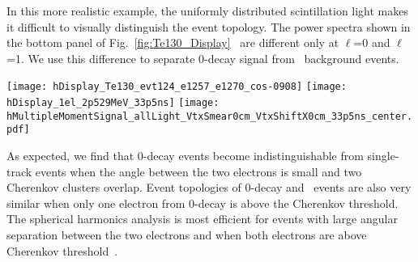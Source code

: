 In this more realistic example, the uniformly distributed
scintillation light makes it difficult to visually distinguish
the event topology. The power spectra shown in the bottom panel of
Fig.~\ref{fig:Te130_Display}~ are different only at $\ell$=0 and
$\ell$=1. We use this difference to separate 0\nbb-decay
signal from \B~background events.

\begin{figure*}[hb]
  \centering
  \texttt{[image: hDisplay\_Te130\_evt124\_e1257\_e1270\_cos-0908]}
  \texttt{[image: hDisplay\_1el\_2p529MeV\_33p5ns]}
  \texttt{[image: hMultipleMomentSignal\_allLight\_VtxSmear0cm\_VtxShiftX0cm\_33p5ns\_center.pdf]} 
  \caption{\emph{Top panels:} Event displays with multiple scattering
and at the center of the detector for: (\emph{top left}) a signal
event with two 1.26~MeV back-to-back electrons; and (\emph{top right}) 
a \B~neutrino background event with a single 2.53~MeV electron. Only early
PEs are shown. The
model QEs are assumed for both Cherenkov PEs (\emph{triangles}) and
scintillation PEs (\emph{crosses}). \emph{Bottom panel:} The normalized
power spectrum $S_{\ell}$ for all early PEs, calculated
event-by-event for 1000 events of 0\nbb-decay signal and \B~neutrino
events. The
heights of the vertical bars corespond to event by event
variation $(\pm 1 ~\sigma)$.}
\label{fig:Te130_Display}
\end{figure*}

As expected, we find that 0\nbb-decay events become indistinguishable from single-track events when
the angle between the two electrons is small and two Cherenkov
clusters overlap. Event topologies of 0\nbb-decay and \B~events are also
very similar when only one electron from 0\nbb-decay is above the Cherenkov
threshold. The spherical harmonics analysis is most efficient
for events with large angular separation between the two electrons and
when both electrons are above Cherenkov threshold~\cite{further_cuts}.



